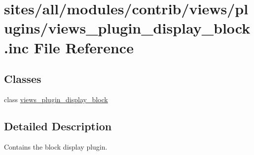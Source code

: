\hypertarget{views__plugin__display__block_8inc}{
\section{sites/all/modules/contrib/views/plugins/views\_\-plugin\_\-display\_\-block.inc File Reference}
\label{views__plugin__display__block_8inc}
}
\subsection*{Classes}
\begin{CompactItemize}
\item 
class \hyperlink{classviews__plugin__display__block}{views\_\-plugin\_\-display\_\-block}
\end{CompactItemize}


\subsection{Detailed Description}
Contains the block display plugin. 